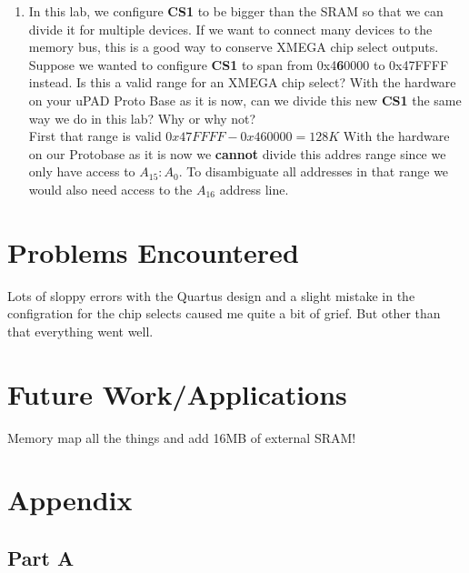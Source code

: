 \documentclass[letterpaper, 12pt]{article}
\begin{document}
\begin{enumerate}
  \item In this lab, we configure \textbf{CS1} to be bigger than the SRAM so that we can divide it for multiple devices. If we want to connect many devices to the memory bus, this is a good way to conserve XMEGA chip select outputs. Suppose we wanted to configure \textbf{CS1} to span from 0x4\textbf{6}0000 to 0x47FFFF instead. Is this a valid range for an XMEGA chip select? With the hardware on your uPAD Proto Base as it is now, can we divide this new \textbf{CS1} the same way we do in this lab? Why or why not? \\
    \hspace*{8pt} First that range is valid $0x47FFFF - 0x460000 = 128K$ With the hardware on our Protobase as it is now we \textbf{cannot} divide this addres range since we only have access to $A_{15}:A_{0}$. To disambiguate all addresses in that range we would also need access to the $A_{16}$ address line.
\end{enumerate}
\section*{Problems Encountered}
Lots of sloppy errors with the Quartus design and a slight mistake in the configration for the chip selects caused me quite a bit of grief. But other than that everything went well.
\section*{Future Work/Applications}
Memory map all the things and add 16MB of external SRAM!
\section*{Appendix}
\subsection*{Part A}
\end{document}
